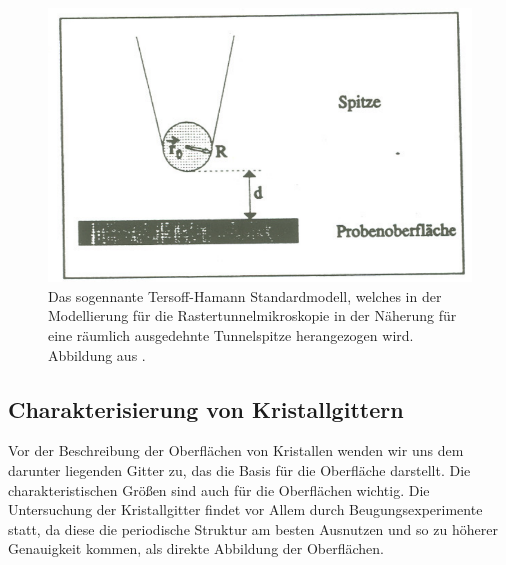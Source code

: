 \begin{figure}
    \includegraphics[width=14cm]{pics/tersoff_hamann}
    \caption{Das sogennante Tersoff-Hamann Standardmodell, welches in
        der Modellierung für die Rastertunnelmikroskopie in der Näherung
        für eine räumlich ausgedehnte Tunnelspitze herangezogen wird.
        Abbildung aus \cite{staatsexamen}.}
\label{fig:tersoff_hamann}
\end{figure}

\subsection{Charakterisierung von Kristallgittern}
Vor der Beschreibung der Oberflächen von Kristallen wenden wir uns dem darunter liegenden 
Gitter zu, das die Basis für die Oberfläche darstellt. Die charakteristischen Größen 
sind auch für die Oberflächen wichtig. Die Untersuchung der Kristallgitter findet vor 
Allem durch Beugungsexperimente statt, da diese die periodische Struktur am besten 
Ausnutzen und so zu höherer Genauigkeit kommen, als direkte Abbildung der Oberflächen. 

